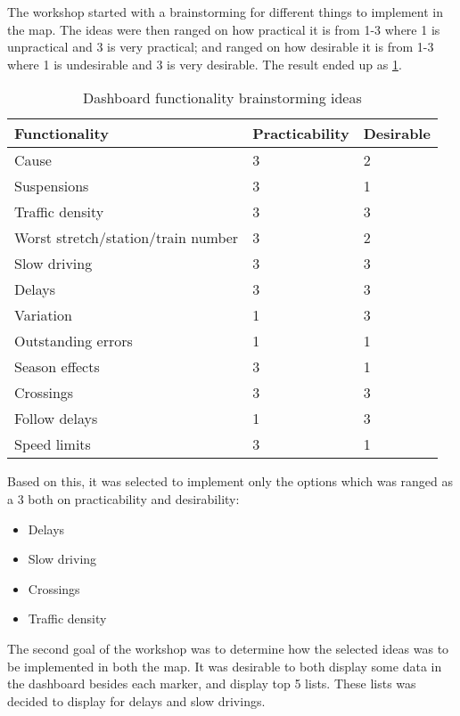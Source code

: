 The workshop started with a brainstorming for different things to implement in
the map. The ideas were then ranged on how practical it is from 1-3 where 1 is
unpractical and 3 is very practical; and ranged on how desirable it is from 1-3
where 1 is undesirable and 3 is very desirable. The result ended up as \ref{table:dashboard_functionality_wants_vs_needs}.

\begin{table}[!h]\small
	\begin{tabularx}{\textwidth}{|X|l|l|}
		\hline
		Functionality & Practicability & Desirable \\
		\hline
		Cause & 3 & 2\\
		\hline
		Suspensions & 3 & 1\\
		\hline
		Traffic density & 3 & 3\\
		\hline
	 	Worst stretch/station/train number & 3 & 2\\
		\hline
		Slow driving & 3 & 3\\
		\hline
		Delays & 3 & 3\\
		\hline
		Variation & 1 & 3\\
		\hline
		Outstanding errors & 1 & 1\\
		\hline
		Season effects & 3 & 1\\
		\hline
		Crossings & 3 & 3\\
		\hline
		Follow delays & 1 & 3\\
		\hline
		Speed limits & 3 & 1\\
		\hline
	\end{tabularx}
\caption{Dashboard functionality brainstorming ideas}
\label{table:dashboard_functionality_wants_vs_needs}
\end{table}

Based on this, it was selected to implement only the options which was ranged
as a 3 both on practicability and desirability:

\begin{itemize}
  \item Delays
  \item Slow driving
  \item Crossings
  \item Traffic density
\end{itemize}

The second goal of the workshop was to determine how the selected ideas was to
be implemented in both the map. It was desirable to both display some data in
the dashboard besides each marker, and display top 5 lists. These lists was
decided to display for delays and slow drivings. 

